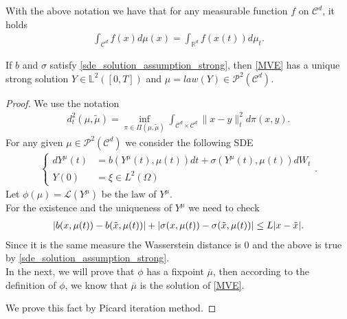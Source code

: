 \begin{remark}
With the above notation we have that for any measurable function $f$ on $\mathcal{C}^d$, it holds
 \begin{align*}
   \int_{\mathcal{C}^{d} } f(x) d\mu(x) = \int_{\mathbb{R}^{d} }  f(x(t)) d\mu_t
 .\end{align*}
\end{remark}
\begin{theorem}\label{solution_vlasov}
  If $b$ and $\sigma $ satisfy \autoref{sde_solution_assumption_strong}, then \autoref{MVE} has a unique  strong solution
  $Y \in  \mathbb{L}^2([0,T])$ and $\mu = law (Y)\in\mathcal{P}^2(\mathcal{C}^{d} )$.
\end{theorem}
\begin{proof}
 We use the notation 
 \begin{align*}
   d_t^2(\mu,\tilde\mu) =  \inf_{\pi  \in  \Pi(\mu,\tilde{\mu } )} \int_{\mathcal{C}^{d} \times  \mathcal{C}^{d}  }\|x-y\|^2_t d\pi(x,y)
 .\end{align*}
 For any given $\mu  \in \mathcal{P}^2(\mathcal{C}^{d} )$ we consider the following SDE 
 \begin{align*}
   \begin{cases} 
   dY^{\mu } (t) &= b(Y^{\mu} (t),\mu(t))dt + \sigma(Y^{\mu } (t),\mu(t))dW_t\\
    Y(0)   &= \xi \in  L^2(\Omega)
   \end{cases}
 .\end{align*}
 Let $\phi(\mu ) = \mathcal{L}(Y^{\mu } ) $ be the law of $Y^{\mu} $. \\[1ex]
 For the existence  and the uniqueness of $Y^{\mu } $ we need to check 
 \begin{align*}
   \lvert b(x,\mu(t)) - b(\tilde{x},\mu(t) )\rvert + \lvert\sigma(x,\mu(t)) - \sigma(\tilde{x},\mu(t))\rvert \le  L \lvert x-\tilde{x} \rvert
 .\end{align*}
 Since it is the same measure the Wasserstein distance is 0 and the above is true by \autoref{sde_solution_assumption_strong}.\\
 
In the next, we will prove that $\phi $ has a fixpoint $\overline{\mu } $, then according to the definition of $\phi$, we know that $\overline{\mu } $ is the solution of \autoref{MVE}.
 
We prove this fact by Picard iteration method. 


\end{proof}
